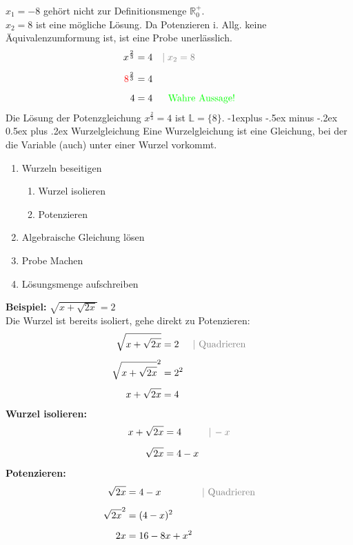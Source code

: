 \documentclass[a4paper,10pt]{article}
\makeatletter
\renewcommand{\subsection}{\@startsection{subsection}{2}{0mm}%
                                {-1explus -.5ex minus -.2ex}%
                                {0.5ex plus .2ex}%
                                {\normalfont\normalsize\bfseries}}
\makeatother
\begin{document}
\begin{multicols}{3}
    $x_1 = -8$ gehört nicht zur Definitionsmenge $\mathbb{R}_{0}^{+}$.\\
    $x_2 = 8$ ist eine mögliche Lösung. Da Potenzieren i. Allg. keine Äquivalenzumformung ist, ist eine Probe unerlässlich.
    \begin{align*} x^{\frac{2}{3}} &= 4 &&{\color{gray}|\; x_2 = 8} \\[5px] {\color{red}8}^{\frac{2}{3}} &= 4 \\[5px] 4 &= 4 &&{\color{green}\phantom{|} \text{ Wahre Aussage!}} \end{align*}
    Die Lösung der Potenzgleichung $x^{\frac{2}{3}} = 4$ ist $\mathbb{L} = \{8\}$.
    \subsection{Wurzelgleichung}
    Eine Wurzelgleichung ist eine Gleichung, bei der die Variable (auch) unter einer Wurzel vorkommt. \\
    \begin{enumerate}
        \item Wurzeln beseitigen
              \begin{enumerate}
                  \item Wurzel isolieren
                  \item Potenzieren
              \end{enumerate}
        \item Algebraische Gleichung lösen
        \item Probe Machen
        \item Lösungsmenge aufschreiben
    \end{enumerate}
    \textbf{Beispiel:} $\sqrt{x + \sqrt{2x}} = 2$ \\
    Die Wurzel ist bereits isoliert, gehe direkt zu Potenzieren:
    \begin{align*} \sqrt{x + \sqrt{2x}} &= 2 &&{\color{gray}| \text{ Quadrieren}} \\[5px] \sqrt{x + \sqrt{2x}}^2 &= 2^2 \\[5px] x + \sqrt{2x} &= 4 \end{align*}
    \textbf{Wurzel isolieren:}
    \begin{align*} x + \sqrt{2x} &= 4 &&{\color{gray}|\, -x} \\[5px] \sqrt{2x} &= 4 - x \end{align*}
    \textbf{Potenzieren:}
    \begin{align*} \sqrt{2x} &= 4 - x &&{\color{gray}| \text{ Quadrieren}} \\[5px] \sqrt{2x}^2 &= (4 - x)^2 \\[5px] 2x &= 16 - 8x + x^2 \end{align*}

\end{multicols}
\end{document}
